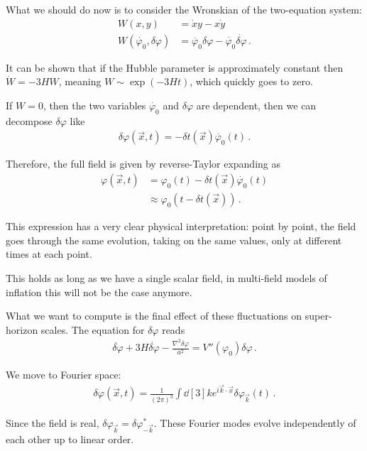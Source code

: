 \documentclass[main.tex]{subfiles}
\begin{document}
What we should do now is to consider the Wronskian of the two-equation system:
%
\begin{align}
W (x, y) &= \dot{x} y - x \dot{y}  \\
W(\dot{\varphi_0}, \delta \varphi ) &= \ddot{\varphi_0} \delta \varphi - \dot{\varphi_0} \dot{ \delta \varphi}
\,.
\end{align}

It can be shown that if the Hubble parameter is approximately constant then \(\dot{W} = - 3 HW\), meaning \(W \sim \exp(- 3 H t)\), which quickly goes to zero.

If \(W = 0\), then the two variables \(\dot{\varphi_0} \) and \(\delta \varphi \) are dependent, then we can decompose \(\delta \varphi \) like 
%
\begin{align}
\delta \varphi (\vec{x}, t) = - \delta t (\vec{x}) \dot{\varphi_0}(t)
\,.
\end{align}

Therefore, the full field is given by reverse-Taylor expanding as 
%
\begin{align}
\varphi (\vec{x}, t) &= \varphi_0 (t) - \delta t(\vec{x}) \dot{\varphi_0}(t)  \\
&\approx \varphi_0 (t - \delta t(\vec{x}))
\,.
\end{align}

This expression has a very clear physical interpretation: point by point, the field goes through the same evolution, taking on the same values, only at different times at each point. 

This holds as long as we have a single scalar field, in multi-field models of inflation this will not be the case anymore. 

What we want to compute is the final effect of these fluctuations on super-horizon scales. 
The equation for \(\delta \varphi \) reads 
%
\begin{align}
\ddot{ \delta \varphi} + 3 H \dot{ \delta \varphi} 
- \frac{\nabla^2 \delta \varphi }{a^2} = V''(\varphi_0 ) \delta \varphi 
\,.
\end{align}

We move to Fourier space: 
%
\begin{align}
\delta \varphi (\vec{x}, t) = \frac{1}{(2\pi )^{3}} \int \dd[3]{k} 
e^{i \vec{k} \cdot \vec{x}} \delta \varphi _{\vec{k}}(t)
\,.
\end{align}

Since the field is real, \(\delta \varphi _{\vec{k}} = \delta \varphi _{- \vec{k}}^{*}\). 
These Fourier modes evolve independently of each other up to linear order. 
\end{document}
